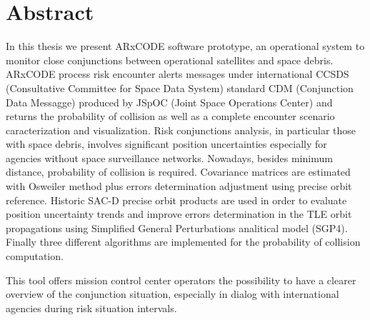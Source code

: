 \chapter*{Abstract}
\label{chap:abstract}



In this thesis we present ARxCODE software prototype, an operational system to monitor close conjunctions between operational satellites and space debris. ARxCODE process risk encounter alerts messages under international CCSDS (Consultative Committee for Space Data System) standard CDM (Conjunction Data Messagge) produced by JSpOC (Joint Space Operations Center) and returns the  probability of collision as well as a complete encounter scenario caracterization and visualization.
Risk conjunctions analysis, in particular those with space debris, involves significant position uncertainties especially for agencies without space surveillance networks. Nowadays, besides minimum distance, probability of collision is required.
Covariance matrices are estimated with Osweiler method plus errors determination adjustment using precise orbit reference. Historic SAC-D precise orbit products are used in order to evaluate position uncertainty trends and improve errors determination in the TLE orbit propagations using Simplified General Perturbations analitical model (SGP4). Finally three different algorithms are implemented for the probability of collision computation. 

This tool offers mission control center operators the possibility to have a clearer overview of the conjunction situation, especially in dialog with international agencies during risk situation intervals.


